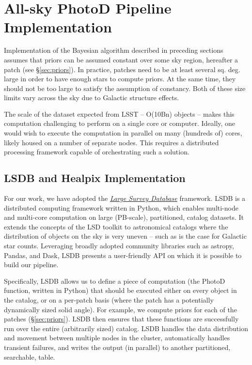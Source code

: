 

\section{All-sky PhotoD Pipeline Implementation \label{sec:LSDBpipe}}



Implementation of the Bayesian algorithm described in preceding sections assumes that priors can be assumed constant over some sky region, hereafter a patch (see \S\ref{sec:priors}). In practice,  patches need to be at least several sq. deg. large in order to have enough stars to compute priors. At the same time, they should not be too large to satisfy the assumption of constancy. Both of these size limits vary across the sky due to Galactic structure effects. 

The scale of the dataset expected from LSST -- O(10Bn) objects -- makes this
computation challenging to perform on a single core or computer. Ideally,
one would wish to execute the computation in parallel on many (hundreds of) cores,
likely housed on a number of separate nodes. This requires a distributed
processing framework capable of orchestrating such a solution.

\subsection{LSDB and Healpix Implementation} 

For our work, we have adopted the \href{https://lsdb.readthedocs.io/}{\em Large Survey Database} 
\citep[LSDB;][]{2024AAS...24326109W} framework. LSDB is a distributed computing framework written in Python,
which enables multi-node and multi-core computation on large (PB-scale),
partitioned, catalog datasets.  It extends the concepts of the LSD toolkit
\citep{2011AAS...21743319J}
to astronomical catalogs where the distribution of objects on the sky is
very uneven -- such as is the case for Galactic star counts.  Leveraging
broadly adopted community libraries such as astropy, Pandas, and Dask, LSDB
presents a user-friendly API on which it is possible to build our pipeline.

Specifically, LSDB allows us to define a piece of computation (the PhotoD
function, written in Python) that should be executed either on every object in
the catalog, or on a per-patch basis (where the patch has a potentially
dynamically sized solid angle). For example, we compute priors for each of the 
patches (\S\ref{sec:priors}). LSDB then ensures that these functions are successfully run over the entire (arbitrarily sized) catalog. LSDB handles the data distribution and
movement between multiple nodes in the cluster, automatically handles
transient failures, and writes the output (in parallel) to another
partitioned, searchable, table.

